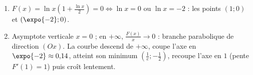 \begin{corrige}
\begin{sol}
\begin{description}
\begin{enumerate}
\[\begin{array}{c|ccccc}
            F'(x) & \| & - & 0 & + & \\ \hline
            F(x) & +\infty & \searrow & -\frac{1}{2} & \nearrow & +\infty
            \end{array}
            \]
      \item $F(x) = \ln x\left( 1 + \frac{\ln x}{2} \right) = 0 \iff \ln x = 0$ ou $\ln x = -2$ : les points $(1 ; 0)$ et $(\expo{-2} ; 0)$.
      \item Asymptote verticale $x = 0$ ; en $+\infty$, $\frac{F(x)}{x} \to 0$ : branche parabolique de direction $(Ox)$.
            La courbe descend de $+\infty$, coupe l'axe en $\expo{-2} \approx 0{,}14$, atteint son minimum $\left(\frac{1}{e} ; -\frac{1}{2}\right)$,
            recoupe l'axe en $1$ (pente $F'(1) = 1$) puis cro\^it lentement.
      \end{enumerate}
\end{description}
\end{sol}


\end{corrige}

